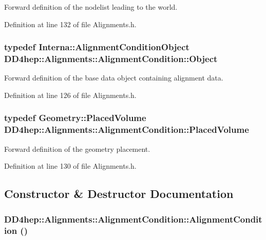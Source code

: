 Forward definition of the nodelist leading to the world. 

Definition at line 132 of file Alignments.h.\hypertarget{class_d_d4hep_1_1_alignments_1_1_alignment_condition_aad9d743ab04b8eb38063249c6a9e16c0}{
\subsubsection[{Object}]{\setlength{\rightskip}{0pt plus 5cm}typedef {\bf Interna::AlignmentConditionObject} {\bf DD4hep::Alignments::AlignmentCondition::Object}}}
\label{class_d_d4hep_1_1_alignments_1_1_alignment_condition_aad9d743ab04b8eb38063249c6a9e16c0}


Forward definition of the base data object containing alignment data. 

Definition at line 126 of file Alignments.h.\hypertarget{class_d_d4hep_1_1_alignments_1_1_alignment_condition_a4d73434f31bcdf1c29d271c14b9122cb}{
\subsubsection[{PlacedVolume}]{\setlength{\rightskip}{0pt plus 5cm}typedef {\bf Geometry::PlacedVolume} {\bf DD4hep::Alignments::AlignmentCondition::PlacedVolume}}}
\label{class_d_d4hep_1_1_alignments_1_1_alignment_condition_a4d73434f31bcdf1c29d271c14b9122cb}


Forward definition of the geometry placement. 

Definition at line 130 of file Alignments.h.

\subsection{Constructor \& Destructor Documentation}
\hypertarget{class_d_d4hep_1_1_alignments_1_1_alignment_condition_a47e83eec8de8934ae9787ecd328ce08e}{
\subsubsection[{AlignmentCondition}]{\setlength{\rightskip}{0pt plus 5cm}DD4hep::Alignments::AlignmentCondition::AlignmentCondition ()}}
\label{class_d_d4hep_1_1_alignments_1_1_alignment_condition_a47e83eec8de8934ae9787ecd328ce08e}


